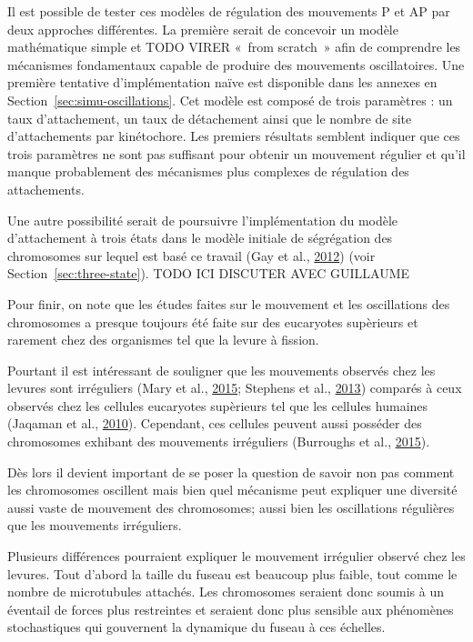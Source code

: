 \documentclass[12pt,a4paper,twoside,openright]{book}
\begin{document}
Il est possible de tester ces modèles de régulation des mouvements P et
AP par deux approches différentes. La première serait de concevoir un
modèle mathématique simple et TODO VIRER «~from scratch~» afin de
comprendre les mécanismes fondamentaux capable de produire des
mouvements oscillatoires. Une première tentative d'implémentation naïve
est disponible dans les annexes en Section~\ref{sec:simu-oscillations}.
Cet modèle est composé de trois paramètres : un taux d'attachement, un
taux de détachement ainsi que le nombre de site d'attachements par
kinétochore. Les premiers résultats semblent indiquer que ces trois
paramètres ne sont pas suffisant pour obtenir un mouvement régulier et
qu'il manque probablement des mécanismes plus complexes de régulation
des attachements.

Une autre possibilité serait de poursuivre l'implémentation du modèle
d'attachement à trois états dans le modèle initiale de ségrégation des
chromosomes sur lequel est basé ce travail (Gay et al.,
\protect\hyperlink{ref-Gay2012a}{2012}) (voir
Section~\ref{sec:three-state}). TODO ICI DISCUTER AVEC GUILLAUME

Pour finir, on note que les études faites sur le mouvement et les
oscillations des chromosomes a presque toujours été faite sur des
eucaryotes supèrieurs et rarement chez des organismes tel que la levure
à fission.

Pourtant il est intéressant de souligner que les mouvements observés
chez les levures sont irréguliers (Mary et al.,
\protect\hyperlink{ref-Mary2015}{2015}; Stephens et al.,
\protect\hyperlink{ref-Stephens2013a}{2013}) comparés à ceux observés
chez les cellules eucaryotes supèrieurs tel que les cellules humaines
(Jaqaman et al., \protect\hyperlink{ref-Jaqaman2010}{2010}). Cependant,
ces cellules peuvent aussi posséder des chromosomes exhibant des
mouvements irréguliers (Burroughs et al.,
\protect\hyperlink{ref-Burroughs2015}{2015}).

Dès lors il devient important de se poser la question de savoir non pas
comment les chromosomes oscillent mais bien quel mécanisme peut
expliquer une diversité aussi vaste de mouvement des chromosomes; aussi
bien les oscillations régulières que les mouvements irréguliers.

Plusieurs différences pourraient expliquer le mouvement irrégulier
observé chez les levures. Tout d'abord la taille du fuseau est beaucoup
plus faible, tout comme le nombre de microtubules attachés. Les
chromosomes seraient donc soumis à un éventail de forces plus
restreintes et seraient donc plus sensible aux phénomènes stochastiques
qui gouvernent la dynamique du fuseau à ces échelles.
\end{document}
